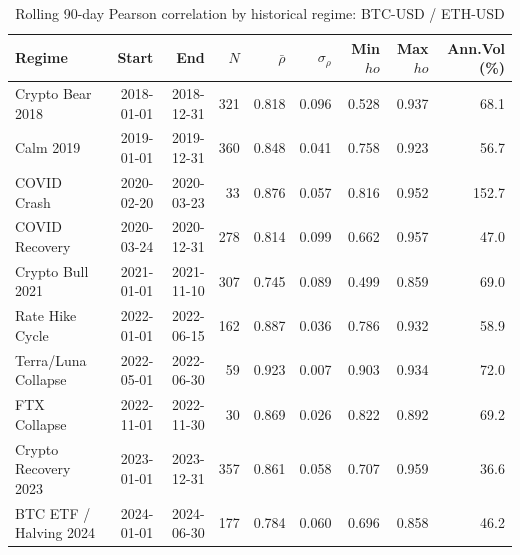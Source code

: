 \begin{table}[H]
\centering
\small
\caption{Rolling 90-day Pearson correlation by historical regime: BTC-USD / ETH-USD}
\label{tab:regime_corr_BTCUSDETHUSD}
\begin{tabular}{lrrrrrrrr}
\toprule
Regime & Start & End & $N$ & $\bar{\rho}$ & $\sigma_\rho$ & Min $
ho$ & Max $
ho$ & Ann.Vol (\%) \\
\midrule
Crypto Bear 2018 & 2018-01-01 & 2018-12-31 & 321 & 0.818 & 0.096 & 0.528 & 0.937 & 68.1 \\
Calm 2019 & 2019-01-01 & 2019-12-31 & 360 & 0.848 & 0.041 & 0.758 & 0.923 & 56.7 \\
COVID Crash & 2020-02-20 & 2020-03-23 & 33 & 0.876 & 0.057 & 0.816 & 0.952 & 152.7 \\
COVID Recovery & 2020-03-24 & 2020-12-31 & 278 & 0.814 & 0.099 & 0.662 & 0.957 & 47.0 \\
Crypto Bull 2021 & 2021-01-01 & 2021-11-10 & 307 & 0.745 & 0.089 & 0.499 & 0.859 & 69.0 \\
Rate Hike Cycle & 2022-01-01 & 2022-06-15 & 162 & 0.887 & 0.036 & 0.786 & 0.932 & 58.9 \\
Terra/Luna Collapse & 2022-05-01 & 2022-06-30 & 59 & 0.923 & 0.007 & 0.903 & 0.934 & 72.0 \\
FTX Collapse & 2022-11-01 & 2022-11-30 & 30 & 0.869 & 0.026 & 0.822 & 0.892 & 69.2 \\
Crypto Recovery 2023 & 2023-01-01 & 2023-12-31 & 357 & 0.861 & 0.058 & 0.707 & 0.959 & 36.6 \\
BTC ETF / Halving 2024 & 2024-01-01 & 2024-06-30 & 177 & 0.784 & 0.060 & 0.696 & 0.858 & 46.2 \\
\bottomrule
\end{tabular}
\end{table}